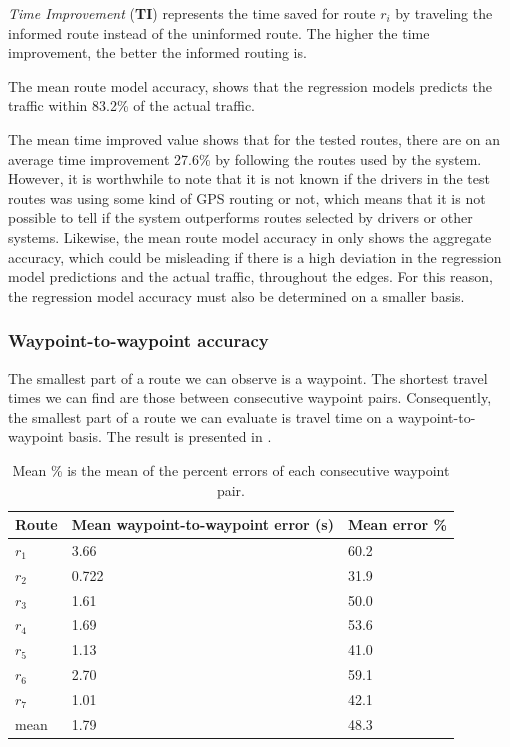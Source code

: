 \emph{Time Improvement} (\textbf{TI}) represents the time saved for route $r_i$ by traveling the informed route instead of the uninformed route. The higher the time improvement, the better the informed routing is.

The mean route model accuracy, shows that the regression models predicts the traffic within 83.2\% of the actual traffic. 

The mean time improved value shows that for the tested routes, there are on an average time improvement 27.6\% by following the routes used by the system. However, it is worthwhile to note that it is not known if the drivers in the test routes was using some kind of GPS routing or not, which means that it is not possible to tell if the system outperforms routes selected by drivers or other systems. Likewise, the mean route model accuracy in  only shows the aggregate accuracy, which could be misleading if there is a high deviation in the regression model predictions and the actual traffic, throughout the edges. For this reason, the regression model accuracy must also be determined on a smaller basis.

\subsubsection{Waypoint-to-waypoint accuracy}
The smallest part of a route we can observe is a waypoint. The shortest travel times we can find are those between consecutive waypoint pairs. Consequently, the smallest part of a route we can evaluate is travel time on a waypoint-to-waypoint basis. The result is presented in .

\begin{table}[H]
	\centering
	\begin{tabular}{lll}
		\textbf{Route} & \textbf{Mean waypoint-to-waypoint error (s)}    & \textbf{Mean error \%} \\ \hline
		$r_1$          & 3.66                                             & 60.2 \\
		$r_2$          & 0.722                                            & 31.9 \\
		$r_3$          & 1.61                                             & 50.0 \\
		$r_4$          & 1.69                                             & 53.6 \\
		$r_5$          & 1.13                                             & 41.0 \\
		$r_6$          & 2.70                                             & 59.1 \\
		$r_7$          & 1.01                                             & 42.1 \\ \hline
		mean           & 1.79                                             & 48.3
	\end{tabular}
	\caption{Mean \% is the mean of the percent errors of each consecutive waypoint pair.}
	\label{tab:eval-results-2}
\end{table}

